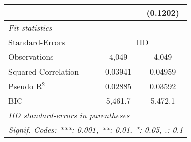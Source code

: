 \begin{tabular}{lcc}
                                         &                 & (0.1202)\\   
   \midrule
   \emph{Fit statistics}\\
   Standard-Errors & \multicolumn{2}{c}{IID} \\ 
   Observations                          & 4,049           & 4,049\\  
   Squared Correlation                   & 0.03941         & 0.04959\\  
   Pseudo R$^2$                          & 0.02885         & 0.03592\\  
   BIC                                   & 5,461.7         & 5,472.1\\  
   \midrule \midrule
   \multicolumn{3}{l}{\emph{IID standard-errors in parentheses}}\\
   \multicolumn{3}{l}{\emph{Signif. Codes: ***: 0.001, **: 0.01, *: 0.05, .: 0.1}}\\
\end{tabular}
\par\endgroup


